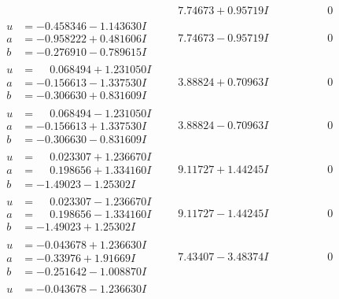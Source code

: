 \documentclass[1p]{elsarticle_modified}
\theoremstyle{definition}
\begin{document}
$$\begin{array}{c|c|c}
 & \phantom{-}7.74673 + 0.95719 I & \phantom{-0.000000 } 0 \\ \hline\begin{aligned}
u &= -0.458346 - 1.143630 I \\
a &= -0.958222 + 0.481606 I \\
b &= -0.276910 - 0.789615 I\end{aligned}
 & \phantom{-}7.74673 - 0.95719 I & \phantom{-0.000000 } 0 \\ \hline\begin{aligned}
u &= \phantom{-}0.068494 + 1.231050 I \\
a &= -0.156613 - 1.337530 I \\
b &= -0.306630 + 0.831609 I\end{aligned}
 & \phantom{-}3.88824 + 0.70963 I & \phantom{-0.000000 } 0 \\ \hline\begin{aligned}
u &= \phantom{-}0.068494 - 1.231050 I \\
a &= -0.156613 + 1.337530 I \\
b &= -0.306630 - 0.831609 I\end{aligned}
 & \phantom{-}3.88824 - 0.70963 I & \phantom{-0.000000 } 0 \\ \hline\begin{aligned}
u &= \phantom{-}0.023307 + 1.236670 I \\
a &= \phantom{-}0.198656 + 1.334160 I \\
b &= -1.49023 - 1.25302 I\end{aligned}
 & \phantom{-}9.11727 + 1.44245 I & \phantom{-0.000000 } 0 \\ \hline\begin{aligned}
u &= \phantom{-}0.023307 - 1.236670 I \\
a &= \phantom{-}0.198656 - 1.334160 I \\
b &= -1.49023 + 1.25302 I\end{aligned}
 & \phantom{-}9.11727 - 1.44245 I & \phantom{-0.000000 } 0 \\ \hline\begin{aligned}
u &= -0.043678 + 1.236630 I \\
a &= -0.33976 + 1.91669 I \\
b &= -0.251642 - 1.008870 I\end{aligned}
 & \phantom{-}7.43407 - 3.48374 I & \phantom{-0.000000 } 0 \\ \hline\begin{aligned}
u &= -0.043678 - 1.236630 I \\

\end{aligned}
\end{array}$$
\end{document}
